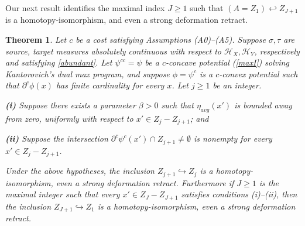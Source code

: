 \documentclass[12pt]{amsart}
\newtheorem{thm}{Theorem}
\theoremstyle{definition}
\theoremstyle{remark}
\newcommand{\del}{\partial}
\newcommand{\sub}{\del^c \psi^c(x')}
\newcommand{\hh}{\hookleftarrow}
\begin{document}
Our next result identifies the maximal index $J\geq 1$ such that $(A=Z_1) \hh Z_{J+1}$ is a homotopy-isomorphism, and even a strong deformation retract. 
\begin{thm}\label{B} 
Let $c$ be a cost satisfying Assumptions (A0)--(A5). Suppose $\sigma, \tau$ are source, target measures absolutely continuous with respect to $\mathscr{H}_X, \mathscr{H}_Y$, respectively and satisfying \eqref{abundant}. Let $\psi^{cc}=\psi$ be a $c$-concave potential (\ref{maxI}) solving Kantorovich's dual max program, and suppose $\phi=\psi^c$ is a $c$-convex potential such that $\del^c \phi(x)$ has finite cardinality for every $x$. Let $j\geq 1$ be an integer. 

\textbf{(i)} Suppose there exists a parameter $\beta>0$ such that $\eta_{avg}(x')$  is bounded away from zero, uniformly with respect to $x' \in Z_j-Z_{j+1}$; and 

\textbf{(ii)} Suppose the intersection $\sub \cap Z_{j+1} \neq \emptyset$ is nonempty for every $x'\in Z_j-Z_{j+1}$. 

Under the above hypotheses, the inclusion $Z_{j+1} \hookrightarrow Z_j$ is a homotopy-isomorphism, even a strong deformation retract. Furthermore if $J\geq 1$ is the maximal integer such that every $x'\in Z_J-Z_{J+1}$ satisfies conditions (i)--(ii), then the inclusion $Z_{J+1} \hookrightarrow Z_1$ is a homotopy-isomorphism, even a strong deformation retract.
\end{thm}





\end{document}
